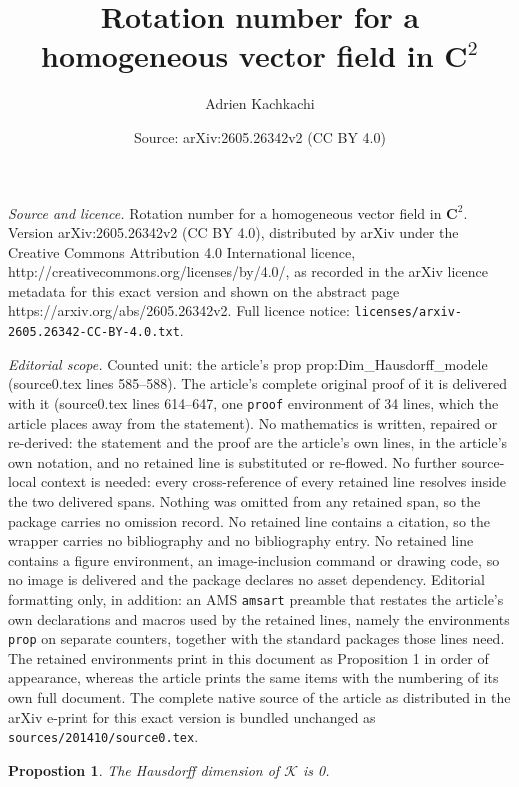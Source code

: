 \documentclass[10pt,a4paper]{amsart}
\title{Rotation number for a homogeneous vector field in $\mathbf{C}^{2}$}
\author{Adrien Kachkachi}
\date{Source: arXiv:2605.26342v2 (CC BY 4.0)}
\newtheorem{prop}{Propostion}
\begin{document}
\maketitle

\noindent\emph{Source and licence.} Rotation number for a homogeneous vector field in $\mathbf{C}^{2}$. Version arXiv:2605.26342v2 (CC BY 4.0), distributed by arXiv under the Creative Commons Attribution 4.0 International licence, http://creativecommons.org/licenses/by/4.0/, as recorded in the arXiv licence metadata for this exact version and shown on the abstract page https://arxiv.org/abs/2605.26342v2. Full licence notice: \texttt{licenses/arxiv-2605.26342-CC-BY-4.0.txt}.\par\smallskip

\noindent\textit{Editorial scope.} Counted unit: the article's prop prop:Dim\_Hausdorff\_modele (source0.tex lines 585--588). The article's complete original proof of it is delivered with it (source0.tex lines 614--647, one \texttt{proof} environment of 34 lines, which the article places away from the statement). No mathematics is written, repaired or re-derived: the statement and the proof are the article's own lines, in the article's own notation, and no retained line is substituted or re-flowed.  No further source-local context is needed: every cross-reference of every retained line resolves inside the two delivered spans.  Nothing was omitted from any retained span, so the package carries no omission record.  No retained line contains a citation, so the wrapper carries no bibliography and no bibliography entry.  No retained line contains a figure environment, an image-inclusion command or drawing code, so no image is delivered and the package declares no asset dependency.  Editorial formatting only, in addition: an AMS \texttt{amsart} preamble that restates the article's own declarations and macros used by the retained lines, namely the environments \texttt{prop} on separate counters, together with the standard packages those lines need.  The retained environments print in this document as Proposition 1 in order of appearance, whereas the article prints the same items with the numbering of its own full document.  The complete native source of the article as distributed in the arXiv e-print for this exact version is bundled unchanged as \texttt{sources/201410/source0.tex}.
\begin{prop}
\label{prop:Dim_Hausdorff_modele}
    The Hausdorff dimension of $\mathcal{K}$ is 0.
\end{prop}
\end{document}

